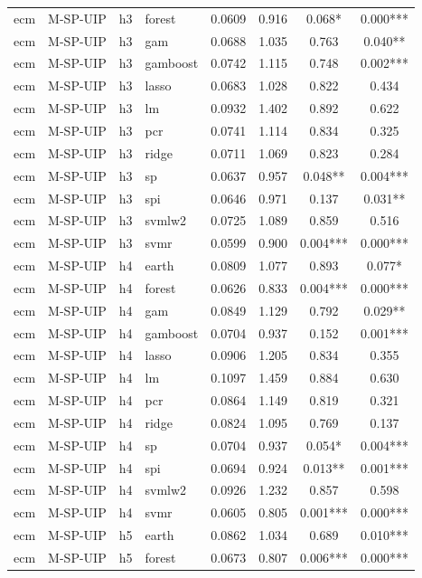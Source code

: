 \begin{ThreePartTable}
\begin{longtable}[t]{llclcccc}
ecm & M-SP-UIP & h3 & forest & 0.0609 & 0.916 & 0.068* & 0.000***\\
ecm & M-SP-UIP & h3 & gam & 0.0688 & 1.035 & 0.763 & 0.040**\\
ecm & M-SP-UIP & h3 & gamboost & 0.0742 & 1.115 & 0.748 & 0.002***\\
ecm & M-SP-UIP & h3 & lasso & 0.0683 & 1.028 & 0.822 & 0.434\\
ecm & M-SP-UIP & h3 & lm & 0.0932 & 1.402 & 0.892 & 0.622\\
ecm & M-SP-UIP & h3 & pcr & 0.0741 & 1.114 & 0.834 & 0.325\\
ecm & M-SP-UIP & h3 & ridge & 0.0711 & 1.069 & 0.823 & 0.284\\
ecm & M-SP-UIP & h3 & sp & 0.0637 & 0.957 & 0.048** & 0.004***\\
ecm & M-SP-UIP & h3 & spi & 0.0646 & 0.971 & 0.137 & 0.031**\\
ecm & M-SP-UIP & h3 & svmlw2 & 0.0725 & 1.089 & 0.859 & 0.516\\
ecm & M-SP-UIP & h3 & svmr & 0.0599 & 0.900 & 0.004*** & 0.000***\\
\addlinespace
ecm & M-SP-UIP & h4 & earth & 0.0809 & 1.077 & 0.893 & 0.077*\\
ecm & M-SP-UIP & h4 & forest & 0.0626 & 0.833 & 0.004*** & 0.000***\\
ecm & M-SP-UIP & h4 & gam & 0.0849 & 1.129 & 0.792 & 0.029**\\
ecm & M-SP-UIP & h4 & gamboost & 0.0704 & 0.937 & 0.152 & 0.001***\\
ecm & M-SP-UIP & h4 & lasso & 0.0906 & 1.205 & 0.834 & 0.355\\
ecm & M-SP-UIP & h4 & lm & 0.1097 & 1.459 & 0.884 & 0.630\\
ecm & M-SP-UIP & h4 & pcr & 0.0864 & 1.149 & 0.819 & 0.321\\
ecm & M-SP-UIP & h4 & ridge & 0.0824 & 1.095 & 0.769 & 0.137\\
ecm & M-SP-UIP & h4 & sp & 0.0704 & 0.937 & 0.054* & 0.004***\\
ecm & M-SP-UIP & h4 & spi & 0.0694 & 0.924 & 0.013** & 0.001***\\
ecm & M-SP-UIP & h4 & svmlw2 & 0.0926 & 1.232 & 0.857 & 0.598\\
ecm & M-SP-UIP & h4 & svmr & 0.0605 & 0.805 & 0.001*** & 0.000***\\
\addlinespace
ecm & M-SP-UIP & h5 & earth & 0.0862 & 1.034 & 0.689 & 0.010***\\
ecm & M-SP-UIP & h5 & forest & 0.0673 & 0.807 & 0.006*** & 0.000***\\

\end{longtable}
\end{ThreePartTable}
